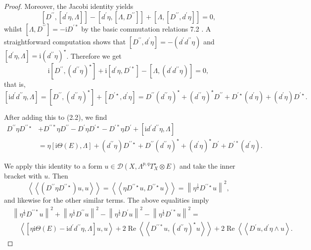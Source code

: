 \documentclass[lang=en,12pt]{beautybook}
\begin{document}
\begin{proof}
Moreover, the Jacobi identity yields
$$
\left[D^{\prime \prime},\left[d^{\prime} \eta, \Lambda\right]\right]-\left[d^{\prime} \eta,\left[\Lambda, D^{\prime \prime}\right]\right]+\left[\Lambda,\left[D^{\prime \prime}, d^{\prime} \eta\right]\right]=0,
$$
whilst $\left[\Lambda, D^{\prime \prime}\right]=-\mathrm{i} D^{\prime *}$ by the basic commutation relations 7.2 . A straightforward computation shows that $\left[D^{\prime \prime}, d^{\prime} \eta\right]=-\left(d^{\prime} d^{\prime \prime} \eta\right)$ and $\left[d^{\prime} \eta, \Lambda\right]=\mathrm{i}\left(d^{\prime \prime} \eta\right)^{\star}$. Therefore we get
$$
\mathrm{i}\left[D^{\prime \prime},\left(d^{\prime \prime} \eta\right)^{\star}\right]+\mathrm{i}\left[d^{\prime} \eta, D^{\prime *}\right]-\left[\Lambda,\left(d^{\prime} d^{\prime \prime} \eta\right)\right]=0,
$$
that is,
$$
\left[\mathrm{i} d^{\prime} d^{\prime \prime} \eta, \Lambda\right]=\left[D^{\prime \prime},\left(d^{\prime \prime} \eta\right)^{\star}\right]+\left[D^{\prime \star}, d^{\prime} \eta\right]=D^{\prime \prime}\left(d^{\prime \prime} \eta\right)^{\star}+\left(d^{\prime \prime} \eta\right)^{\star} D^{\prime \prime}+D^{\prime \star}\left(d^{\prime} \eta\right)+\left(d^{\prime} \eta\right) D^{\prime \star} .
$$

After adding this to (2.2), we find
$$
\begin{aligned}
D^{\prime \prime} \eta D^{\prime \prime \star} & +D^{\prime \prime *} \eta D^{\prime \prime}-D^{\prime} \eta D^{\prime \star}-D^{\prime *} \eta D^{\prime}+\left[\mathrm{i} d^{\prime} d^{\prime \prime} \eta, \Lambda\right] \\
& =\eta[\mathrm{i} \Theta(E), \Lambda]+\left(d^{\prime \prime} \eta\right) D^{\prime \prime \star}+D^{\prime \prime}\left(d^{\prime \prime} \eta\right)^{\star}+\left(d^{\prime} \eta\right)^{\star} D^{\prime}+D^{\prime *}\left(d^{\prime} \eta\right) .
\end{aligned}
$$

We apply this identity to a form $u \in \mathcal{D}\left(X, \Lambda^{p, q} T_X^{\star} \otimes E\right)$ and take the inner bracket with $u$. Then
$$
\left\langle\left\langle\left(D^{\prime \prime} \eta D^{\prime \prime \star}\right) u, u\right\rangle\right\rangle=\left\langle\left\langle\eta D^{\prime \prime \star} u, D^{\prime \prime \star} u\right\rangle\right\rangle=\left\|\eta^{\frac{1}{2}} D^{\prime \prime \star} u\right\|^2,
$$
and likewise for the other similar terms. The above equalities imply
$$
\begin{aligned}
& \left\|\eta^{\frac{1}{2}} D^{\prime \prime *} u\right\|^2+\left\|\eta^{\frac{1}{2}} D^{\prime \prime} u\right\|^2-\left\|\eta^{\frac{1}{2}} D^{\prime} u\right\|^2-\left\|\eta^{\frac{1}{2}} D^{\prime *} u\right\|^2= \\
& \quad\left\langle\left[\eta \mathrm{i} \Theta(E)-\mathrm{i} d^{\prime} d^{\prime \prime} \eta, \Lambda\right] u, u\right\rangle+2 \operatorname{Re}\left\langle\left\langle D^{\prime \prime *} u,\left(d^{\prime \prime} \eta\right)^{\star} u\right\rangle\right\rangle+2 \operatorname{Re}\left\langle\left\langle D^{\prime} u, d^{\prime} \eta \wedge u\right\rangle .\right.
\end{aligned}
$$


\end{proof}
\end{document}
